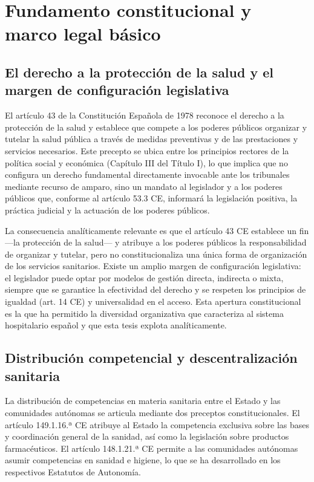 
\section{Fundamento constitucional y marco legal básico}
\label{sec:fundamento}

\subsection{El derecho a la protección de la salud y el margen de configuración legislativa}

El artículo 43 de la Constitución Española de 1978 reconoce el derecho a la protección de la salud y establece que compete a los poderes públicos organizar y tutelar la salud pública a través de medidas preventivas y de las prestaciones y servicios necesarios. Este precepto se ubica entre los principios rectores de la política social y económica (Capítulo III del Título I), lo que implica que no configura un derecho fundamental directamente invocable ante los tribunales mediante recurso de amparo, sino un mandato al legislador y a los poderes públicos que, conforme al artículo 53.3 CE, informará la legislación positiva, la práctica judicial y la actuación de los poderes públicos.

La consecuencia analíticamente relevante es que el artículo 43 CE establece un fin ---la protección de la salud--- y atribuye a los poderes públicos la responsabilidad de organizar y tutelar, pero no constitucionaliza una única forma de organización de los servicios sanitarios. Existe un amplio margen de configuración legislativa: el legislador puede optar por modelos de gestión directa, indirecta o mixta, siempre que se garantice la efectividad del derecho y se respeten los principios de igualdad (art. 14 CE) y universalidad en el acceso. Esta apertura constitucional es la que ha permitido la diversidad organizativa que caracteriza al sistema hospitalario español y que esta tesis explota analíticamente.

\subsection{Distribución competencial y descentralización sanitaria}

La distribución de competencias en materia sanitaria entre el Estado y las comunidades autónomas se articula mediante dos preceptos constitucionales. El artículo 149.1.16.ª CE atribuye al Estado la competencia exclusiva sobre las bases y coordinación general de la sanidad, así como la legislación sobre productos farmacéuticos. El artículo 148.1.21.ª CE permite a las comunidades autónomas asumir competencias en sanidad e higiene, lo que se ha desarrollado en los respectivos Estatutos de Autonomía.

